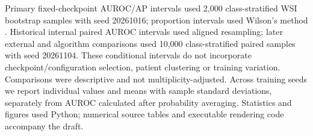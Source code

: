Primary fixed-checkpoint AUROC/AP intervals used 2,000 class-stratified WSI bootstrap samples with seed 20261016; proportion intervals used Wilson's method \citep{ref19}. Historical internal paired AUROC intervals used aligned resampling; later external and algorithm comparisons used 10,000 class-stratified paired samples with seed 20261104. These conditional intervals do not incorporate checkpoint/configuration selection, patient clustering or training variation. Comparisons were descriptive and not multiplicity-adjusted. Across training seeds we report individual values and means with sample standard deviations, separately from AUROC calculated after probability averaging. Statistics and figures used Python; numerical source tables and executable rendering code accompany the draft.
